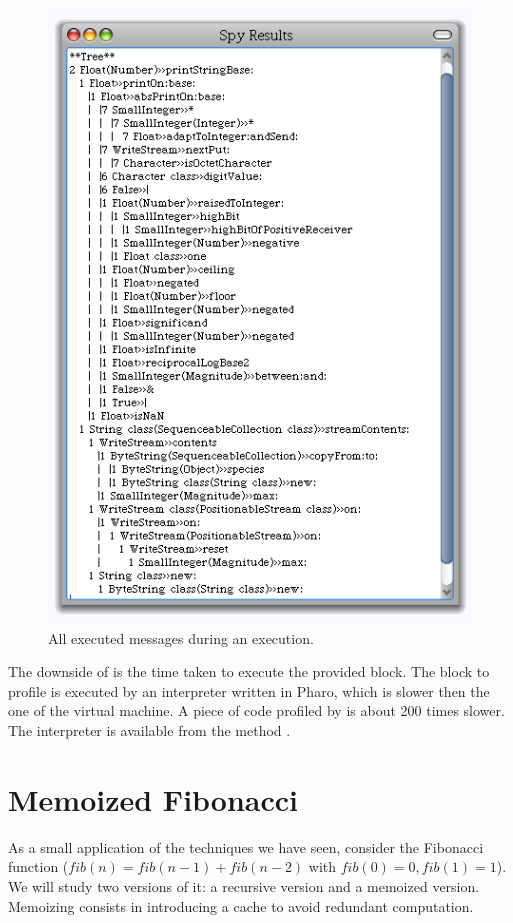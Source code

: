 \documentclass[a4paper,10pt,twoside]{book}
\begin{document}
\begin{figure}
	\begin{center}
	\includegraphics[width=.8\linewidth]{sendTally}
	\caption{All executed messages during an execution.}
	\end{center}
\end{figure}

The downside of  is the time taken to execute the provided block. The block to profile is executed by an interpreter written in Pharo, which is slower then the one of the virtual machine. A piece of code profiled by  is about 200 times slower. The interpreter is available from the method .

\section{Memoized Fibonacci}

As a small application of the techniques we have seen, consider the Fibonacci function ($fib (n) = fib (n-1) + fib(n-2)$ with $fib(0)=0, fib(1)=1$). We will study two versions of it: a recursive version and a memoized version. Memoizing consists in introducing a cache to avoid redundant computation.
\end{document}
